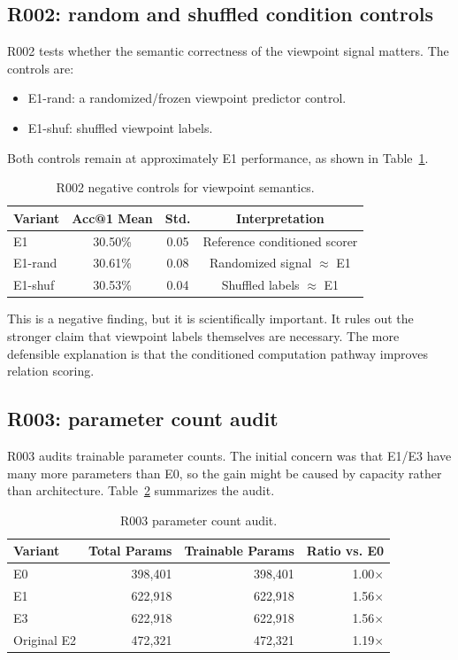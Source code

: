 \documentclass[11pt]{article}
\makeatletter
\newcommand{\acc}{Acc@1}
\makeatother
\begin{document}
\subsection{R002: random and shuffled condition controls}

R002 tests whether the semantic correctness of the viewpoint signal matters. The controls are:
\begin{itemize}
  \item E1-rand: a randomized/frozen viewpoint predictor control.
  \item E1-shuf: shuffled viewpoint labels.
\end{itemize}
Both controls remain at approximately E1 performance, as shown in Table~\ref{tab:r002}.

\begin{table}[t]
\centering
\small
\caption{R002 negative controls for viewpoint semantics.}
\label{tab:r002}
\begin{tabular}{lccc}
\toprule
Variant & \acc{} Mean & Std. & Interpretation \\
\midrule
E1 & 30.50\% & 0.05 & Reference conditioned scorer \\
E1-rand & 30.61\% & 0.08 & Randomized signal $\approx$ E1 \\
E1-shuf & 30.53\% & 0.04 & Shuffled labels $\approx$ E1 \\
\bottomrule
\end{tabular}
\end{table}

This is a negative finding, but it is scientifically important. It rules out the stronger claim that viewpoint labels themselves are necessary. The more defensible explanation is that the conditioned computation pathway improves relation scoring.

\subsection{R003: parameter count audit}

R003 audits trainable parameter counts. The initial concern was that E1/E3 have many more parameters than E0, so the gain might be caused by capacity rather than architecture. Table~\ref{tab:r003} summarizes the audit.

\begin{table}[t]
\centering
\small
\caption{R003 parameter count audit.}
\label{tab:r003}
\begin{tabular}{lrrr}
\toprule
Variant & Total Params & Trainable Params & Ratio vs. E0 \\
\midrule
E0 & 398,401 & 398,401 & 1.00$\times$ \\
E1 & 622,918 & 622,918 & 1.56$\times$ \\
E3 & 622,918 & 622,918 & 1.56$\times$ \\
Original E2 & 472,321 & 472,321 & 1.19$\times$ \\
\bottomrule
\end{tabular}
\end{table}
\end{document}
